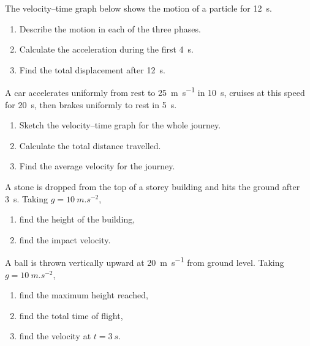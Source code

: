 \documentclass[11pt]{article}
\newcounter{popsec}
\newcounter{popsub}
\newcommand{\courssub}[1]{%
  \stepcounter{popsub}%
  \par\vspace{9pt}\noindent{\popxbold\fontsize{11.5}{13}\selectfont\color{popink}{\color{poporange}\thepopsec.\thepopsub}\hspace{6pt}#1}\par\nopagebreak\vspace{4pt}
}
\begin{document}
\begin{exercice}
The velocity–time graph below shows the motion of a particle for \SI{12}{s}.
\begin{center}
\end{center}
\begin{enumerate}
\item Describe the motion in each of the three phases.
\item Calculate the acceleration during the first \SI{4}{s}.
\item Find the total displacement after \SI{12}{s}.
\end{enumerate}
\end{exercice}

\courssub{I practise}

\begin{exercice}
A car accelerates uniformly from rest to \SI{25}{m.s^{-1}} in \SI{10}{s}, cruises at this speed for \SI{20}{s}, then brakes uniformly to rest in \SI{5}{s}.
\begin{enumerate}
\item Sketch the velocity–time graph for the whole journey.
\item Calculate the total distance travelled.
\item Find the average velocity for the journey.
\end{enumerate}
\end{exercice}

\begin{exercice}
A stone is dropped from the top of a storey building and hits the ground after \SI{3}{s}. Taking $g = \SI{10}{m.s^{-2}}$,
\begin{enumerate}
\item find the height of the building,
\item find the impact velocity.
\end{enumerate}
\end{exercice}

\begin{exercice}
A ball is thrown vertically upward at \SI{20}{m.s^{-1}} from ground level. Taking $g = \SI{10}{m.s^{-2}}$,
\begin{enumerate}
\item find the maximum height reached,
\item find the total time of flight,
\item find the velocity at $t = \SI{3}{s}$.
\end{enumerate}
\end{exercice}
\end{document}
